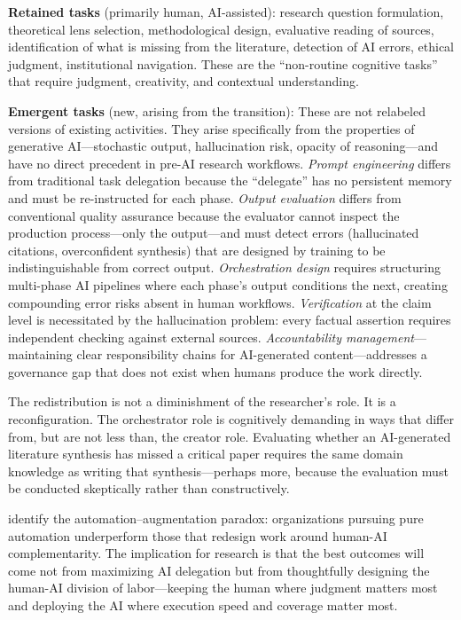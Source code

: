 \documentclass{article}
\begin{document}
\textbf{Retained tasks} (primarily human, AI-assisted): research question formulation, theoretical lens selection, methodological design, evaluative reading of sources, identification of what is missing from the literature, detection of AI errors, ethical judgment, institutional navigation. These are the ``non-routine cognitive tasks'' that require judgment, creativity, and contextual understanding.

\textbf{Emergent tasks} (new, arising from the transition): These are not relabeled versions of existing activities. They arise specifically from the properties of generative AI---stochastic output, hallucination risk, opacity of reasoning---and have no direct precedent in pre-AI research workflows. \textit{Prompt engineering} differs from traditional task delegation because the ``delegate'' has no persistent memory and must be re-instructed for each phase. \textit{Output evaluation} differs from conventional quality assurance because the evaluator cannot inspect the production process---only the output---and must detect errors (hallucinated citations, overconfident synthesis) that are designed by training to be indistinguishable from correct output. \textit{Orchestration design} requires structuring multi-phase AI pipelines where each phase's output conditions the next, creating compounding error risks absent in human workflows. \textit{Verification} at the claim level is necessitated by the hallucination problem: every factual assertion requires independent checking against external sources. \textit{Accountability management}---maintaining clear responsibility chains for AI-generated content---addresses a governance gap that does not exist when humans produce the work directly.

The redistribution is not a diminishment of the researcher's role. It is a reconfiguration. The orchestrator role is cognitively demanding in ways that differ from, but are not less than, the creator role. Evaluating whether an AI-generated literature synthesis has missed a critical paper requires the same domain knowledge as writing that synthesis---perhaps more, because the evaluation must be conducted skeptically rather than constructively.

\citet{raisch2021ai} identify the automation--augmentation paradox: organizations pursuing pure automation underperform those that redesign work around human-AI complementarity. The implication for research is that the best outcomes will come not from maximizing AI delegation but from thoughtfully designing the human-AI division of labor---keeping the human where judgment matters most and deploying the AI where execution speed and coverage matter most.
\end{document}
